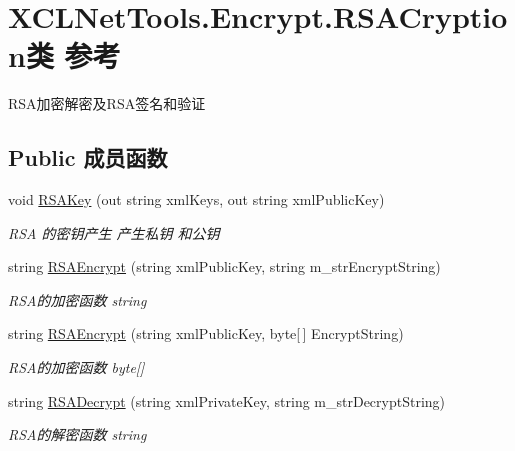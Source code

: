 \hypertarget{class_x_c_l_net_tools_1_1_encrypt_1_1_r_s_a_cryption}{\section{X\-C\-L\-Net\-Tools.\-Encrypt.\-R\-S\-A\-Cryption类 参考}
\label{class_x_c_l_net_tools_1_1_encrypt_1_1_r_s_a_cryption}
}


R\-S\-A加密解密及\-R\-S\-A签名和验证  


\subsection*{Public 成员函数}
\begin{DoxyCompactItemize}
\item 
void \hyperlink{class_x_c_l_net_tools_1_1_encrypt_1_1_r_s_a_cryption_ac91142d16f1762747461af4491bbd76d}{R\-S\-A\-Key} (out string xml\-Keys, out string xml\-Public\-Key)
\begin{DoxyCompactList}\small\item\em R\-S\-A 的密钥产生 产生私钥 和公钥 \end{DoxyCompactList}\item 
string \hyperlink{class_x_c_l_net_tools_1_1_encrypt_1_1_r_s_a_cryption_a15ae7532ba367753f784e08a153ea79b}{R\-S\-A\-Encrypt} (string xml\-Public\-Key, string m\-\_\-str\-Encrypt\-String)
\begin{DoxyCompactList}\small\item\em R\-S\-A的加密函数 string \end{DoxyCompactList}\item 
string \hyperlink{class_x_c_l_net_tools_1_1_encrypt_1_1_r_s_a_cryption_a3c6604c439e1ff1aa07d2d5724157b19}{R\-S\-A\-Encrypt} (string xml\-Public\-Key, byte\mbox{[}$\,$\mbox{]} Encrypt\-String)
\begin{DoxyCompactList}\small\item\em R\-S\-A的加密函数 byte\mbox{[}\mbox{]} \end{DoxyCompactList}\item 
string \hyperlink{class_x_c_l_net_tools_1_1_encrypt_1_1_r_s_a_cryption_a5daa894b5020479ee2af68fe3fe75a41}{R\-S\-A\-Decrypt} (string xml\-Private\-Key, string m\-\_\-str\-Decrypt\-String)
\begin{DoxyCompactList}\small\item\em R\-S\-A的解密函数 string \end{DoxyCompactList}\item 

\end{DoxyCompactItemize}
